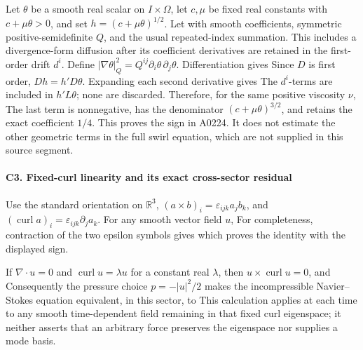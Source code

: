 Let \(\theta\) be a smooth real scalar on \(I\times\Omega\), let
\(c,\mu\) be fixed real constants with \(c+\mu\theta>0\), and set
\(h=(c+\mu\theta)^{1/2}\). Let  with smooth coefficients, symmetric positive-semidefinite \(Q\), and
the usual repeated-index summation. This includes a divergence-form
diffusion after its coefficient derivatives are retained in the
first-order drift \(d^i\). Define
\(|\nabla\theta|_Q^2=Q^{ij}\partial_i\theta\,\partial_j\theta\).
Differentiation gives  Since \(D\) is first order, \(Dh=h'D\theta\). Expanding each second
derivative gives  The \(d^i\)-terms are included in \(h'L\theta\); none are discarded.
Therefore, for the same positive viscosity \(\nu\),  The last term is nonnegative, has the denominator
\((c+\mu\theta)^{3/2}\), and retains the exact coefficient \(1/4\). This
proves the sign in A0224. It does not estimate the other geometric terms
in the full swirl equation, which are not supplied in this source
segment.

\paragraph{C3. Fixed-curl linearity and its exact cross-sector
residual}\label{TranscriptLedgerStage:c3.-fixed-curl-linearity-and-its-exact-cross-sector-residual}

Use the standard orientation on \(\mathbb R^3\),
\((a\times b)_i=\varepsilon_{ijk}a_jb_k\), and
\((\operatorname{curl}a)_i=\varepsilon_{ijk}\partial_ja_k\). For any
smooth vector field \(u\),  For completeness, contraction of the two epsilon symbols gives
 which proves the identity with the displayed sign.

If \(\nabla\cdot u=0\) and \(\operatorname{curl}u=\lambda u\) for a
constant real \(\lambda\), then \(u\times\operatorname{curl}u=0\), and
 Consequently the pressure choice \(p=-|u|^2/2\) makes the
incompressible Navier--Stokes equation equivalent, in this sector, to
 This calculation applies at each time to any smooth time-dependent
field remaining in that fixed curl eigenspace; it neither asserts that
an arbitrary force preserves the eigenspace nor supplies a mode basis.

